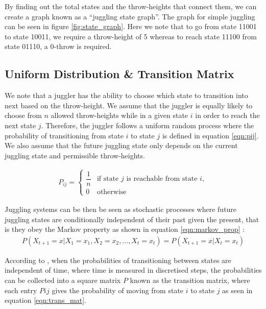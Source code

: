 \documentclass{article}
\theoremstyle{definition}
\theoremstyle{remark}
\numberwithin{equation}{section}
\begin{document}
By finding out the total states and the throw-heights that connect them, we can create a graph known as a ``juggling state graph''. The graph for simple juggling  can be seen in figure \ref{fig:state_graph}. Here we note that to go from state 11001 to state 10011, we require a throw-height of 5 whereas to reach state 11100 from state 01110, a 0-throw is required. 

\subsection{Uniform Distribution \& Transition Matrix} \label{sec:unif_dist}
We note that a juggler has the ability to choose which state to transition into next based on the throw-height. We assume that the juggler is equally likely to choose from $n$ allowed throw-heights while in a given state $i$ in order to reach the next state $j$. Therefore, the juggler follows a uniform random process \cite[p.105]{ProbStatAlex} where the probability of transitioning from state $i$ to state $j$ is defined in equation \ref{eqn:pij}. We also assume that the future juggling state only depends on the current juggling state and permissible throw-heights.


\begin{align}
        \label{eqn:pij} P_{ij} =\begin{cases}
                  \dfrac{1}{n} & \text{if state } j \text{ is reachable from state } i,\\[2mm]
                  0 & \text{otherwise}
              \end{cases}
    \end{align}

Juggling systems can be then be seen as stochastic processes where future juggling states are conditionally independent of their past given the present, that is they obey the Markov property as shown in equation \ref{eqn:markov_prop} \cite[p.1715]{MarkovChains}:
\begin{align}
    \label{eqn:markov_prop}P(X_{t+1} = x | X_1 = x_1, X_2 = x_2, ..., X_{t}=x_{t}) = P(X_{t+1} = x | X_{t}=x_{t})
\end{align}

According to \cite[p.1715]{MarkovChains}, when the probabilities of transitioning between states are independent of time, where time is measured in discretised steps, the probabilities can be collected into a square matrix $P$ known as the transition matrix, where each entry $Pij$ gives the probability of moving from state $i$ to state $j$ as seen in equation \ref{eqn:trans_mat}.
\end{document}
